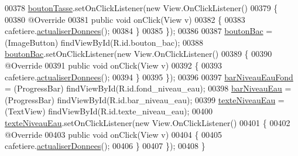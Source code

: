 \begin{DoxyCode}
00378         \hyperlink{classcom_1_1example_1_1ekawa_1_1_ihm_a32e7322f35858a93cdfb75e06f788842}{boutonTasse}.setOnClickListener(\textcolor{keyword}{new} View.OnClickListener()
00379         \{
00380             @Override
00381             \textcolor{keyword}{public} \textcolor{keywordtype}{void} onClick(View v)
00382             \{
00383                 cafetiere.\hyperlink{classcom_1_1example_1_1ekawa_1_1_cafetiere_a1c6b2ea0e069cda876260e18ea8f6e84}{actualiserDonnees}();
00384             \}
00385         \});
00386 
00387         \hyperlink{classcom_1_1example_1_1ekawa_1_1_ihm_a6c4ca9f4166d4ceee1bee82b4f7508a4}{boutonBac} = (ImageButton) findViewById(R.id.bouton\_bac);
00388         \hyperlink{classcom_1_1example_1_1ekawa_1_1_ihm_a6c4ca9f4166d4ceee1bee82b4f7508a4}{boutonBac}.setOnClickListener(\textcolor{keyword}{new} View.OnClickListener()
00389         \{
00390             @Override
00391             \textcolor{keyword}{public} \textcolor{keywordtype}{void} onClick(View v)
00392             \{
00393                 cafetiere.\hyperlink{classcom_1_1example_1_1ekawa_1_1_cafetiere_a1c6b2ea0e069cda876260e18ea8f6e84}{actualiserDonnees}();
00394             \}
00395         \});
00396 
00397         \hyperlink{classcom_1_1example_1_1ekawa_1_1_ihm_a104a80153a74a9cbcbd757c24ce84a36}{barNiveauEauFond} = (ProgressBar) findViewById(R.id.fond\_niveau\_eau);
00398         \hyperlink{classcom_1_1example_1_1ekawa_1_1_ihm_a9023d37b98385b21d2b5dd6910c13020}{barNiveauEau} = (ProgressBar) findViewById(R.id.bar\_niveau\_eau);
00399         \hyperlink{classcom_1_1example_1_1ekawa_1_1_ihm_aa20f5ea009dec0e50b6df5aaffbb690c}{texteNiveauEau} = (TextView) findViewById(R.id.texte\_niveau\_eau);
00400         \hyperlink{classcom_1_1example_1_1ekawa_1_1_ihm_aa20f5ea009dec0e50b6df5aaffbb690c}{texteNiveauEau}.setOnClickListener(\textcolor{keyword}{new} View.OnClickListener()
00401         \{
00402             @Override
00403             \textcolor{keyword}{public} \textcolor{keywordtype}{void} onClick(View v)
00404             \{
00405                 cafetiere.\hyperlink{classcom_1_1example_1_1ekawa_1_1_cafetiere_a1c6b2ea0e069cda876260e18ea8f6e84}{actualiserDonnees}();
00406             \}
00407         \});
00408     \}
\end{DoxyCode}
\mbox{\label{classcom_1_1example_1_1ekawa_1_1_ihm_a08b1da8fdc68effff9a6da918e14d12d}} 

